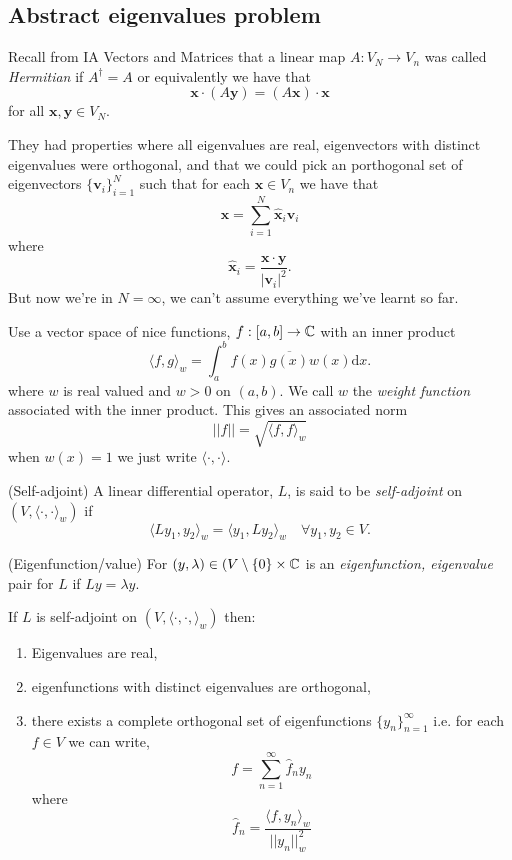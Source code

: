 \documentclass{article}
\begin{document}
	 \subsection{Abstract eigenvalues problem}
	 Recall from IA Vectors and Matrices that a linear map $ A:V_N\to V_n $ was called \textit{Hermitian} if $ A^\dagger = A $ or equivalently we have that
	 \[
	   \mathbf x \cdot(A\mathbf y)=(A\mathbf x)\cdot \mathbf x
	 \]
	 for all $ \mathbf x,\mathbf y\in V_N $.\par
	 They had properties where all eigenvalues are real, eigenvectors with distinct eigenvalues were orthogonal, and that we could pick an porthogonal set of eigenvectors $ \{\mathbf v_i\}^N_{i=1} $ such that for each $ \mathbf x\in V_n $ we have that
	 \[
		 \mathbf x = \sum_{i=1}^N\hat{\mathbf x}_i\mathbf v_i
	 \]
	 where
	 \[
		 \hat{\mathbf x}_i=\frac{\mathbf x\cdot \mathbf y}{|\mathbf v_i|^2}.
	 \]
	 But now we're in $ N=\infty $, we can't assume everything we've learnt so far.\par
	 Use a vector space of nice functions, $ f:[a,b]\to \mathbb{C} $ with an inner product
	 \[
		 \langle f,g\rangle_w=\int_a^bf(x)\overline{g(x)}w(x)\mathrm dx.
	 \]
	 where $ w $ is real valued and $ w>0 $ on $ (a,b) $. We call $ w $ the \textit{weight function} associated with the inner product. This gives an associated norm
	 \[
		 ||f||=\sqrt{\langle f,f\rangle_w}
	 \]
	 when $ w(x)=1 $ we just write $ \langle \cdot, \cdot \rangle $.
	 \begin{definition}
		 (Self-adjoint) A linear differential operator, $ L $, is said to be \textit{self-adjoint} on $ (V,\langle \cdot,\cdot\rangle_w) $ if
		 \[
		   \langle Ly_1,y_2\rangle_w=\langle y_1,Ly_2\rangle_w\quad\forall y_1,y_2\in V.
		 \]
	 \end{definition}
	 \begin{definition}
		 (Eigenfunction/value) For $ (y,\lambda) \in (V\setminus\{0\}\times \mathbb{C} $ is an \textit{eigenfunction, eigenvalue} pair for $ L $ if $ Ly=\lambda y $.
	 \end{definition}
	 \begin{proposition}
	  If $ L $ is self-adjoint on $ (V,\langle \cdot,\cdot,\rangle_w) $ then:
	  \begin{enumerate}
		  \item Eigenvalues are real,
		  \item eigenfunctions with distinct eigenvalues are orthogonal,
		  \item there exists a complete orthogonal set of eigenfunctions $ \{y_n\}_{n=1}^\infty $ i.e. for each $ f \in V $ we can write,
			  \[
				  f=\sum_{n=1}^\infty \hat f_ny_n
			  \]
			  where
			  \[
				  \hat f_n=\frac{\langle f, y_n\rangle_w}{||y_n||_w^2}
			  \]
	  \end{enumerate}
	 \end{proposition}
\end{document}
